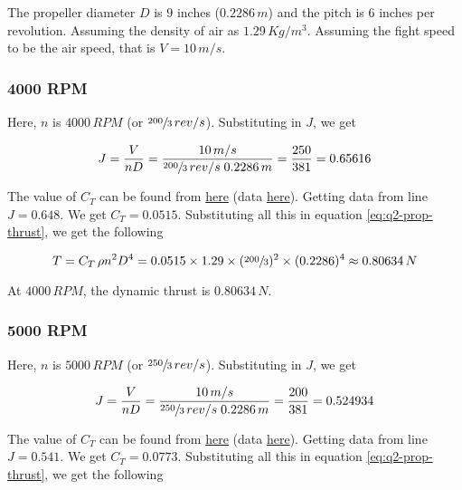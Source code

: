 The propeller diameter $D$ is $9$ inches ($0.2286\,m$) and the pitch is $6$ inches per revolution. Assuming the density of air as $1.29\,Kg/m^3$.
Assuming the fight speed to be the air speed, that is $V = 10\,m/s$.

\subsubsection*{4000 RPM}

Here, $n$ is $4000\,RPM$ (or $\sfrac{200}{3}\,rev/s$). Substituting in $J$, we get

\begin{equation*}
    J = \frac{V}{nD} = \frac{10\,m/s}{\sfrac{200}{3}\,rev/s \; 0.2286\,m} = \frac{250}{381} = 0.65616
\end{equation*}

The value of $C_T$ can be found from \href{https://m-selig.ae.illinois.edu/props/volume-1/plots/apcsf_9x6_ct.png}{here} (data \href{https://m-selig.ae.illinois.edu/props/volume-1/data/apcsf_9x6_kt0980_4016.txt}{here}). Getting data from line $J=0.648$. We get $C_T=0.0515$. Substituting all this in equation \ref{eq:q2-prop-thrust}, we get the following

\begin{equation*}
    T = C_T \, \rho n^2 D^4 = 0.0515 \times 1.29 \times (\sfrac{200}{3})^2 \times (0.2286)^4 \approx 0.80634\,N
\end{equation*}

At $4000\,RPM$, the dynamic thrust is $0.80634\,N$.

\subsubsection*{5000 RPM}

Here, $n$ is $5000\,RPM$ (or $\sfrac{250}{3}\,rev/s$). Substituting in $J$, we get

\begin{equation*}
    J = \frac{V}{nD} = \frac{10\,m/s}{\sfrac{250}{3}\,rev/s \; 0.2286\,m} = \frac{200}{381} = 0.524934
\end{equation*}

The value of $C_T$ can be found from \href{https://m-selig.ae.illinois.edu/props/volume-1/plots/apcsf_9x6_ct.png}{here} (data \href{https://m-selig.ae.illinois.edu/props/volume-1/data/apcsf_9x6_kt0982_5006.txt}{here}). Getting data from line $J = 0.541$. We get $C_T = 0.0773$. Substituting all this in equation \ref{eq:q2-prop-thrust}, we get the following

